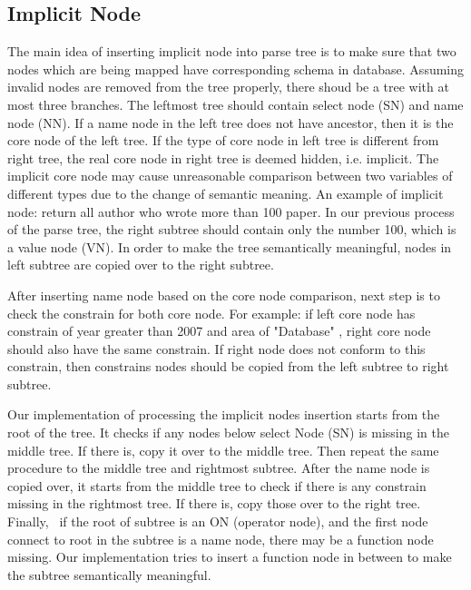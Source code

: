 \documentclass[twocolumn]{article}
\begin{document}
\subsection{Implicit Node}
The main idea of inserting implicit node into parse tree is to make sure that two nodes which are being mapped have corresponding schema in database. Assuming invalid nodes are removed from the tree properly, there shoud be a tree with at most three branches. The leftmost tree should contain select node (SN) and name node (NN). If a name node in the left tree does not have ancestor, then it is the core node of the left tree. If the type of core node in left tree is different from right tree, the real core node in right tree is deemed hidden, i.e. implicit. The implicit core node may cause unreasonable comparison between two variables of different types due to the change of semantic meaning. An example of implicit node: return all author who wrote more than 100 paper. In our previous process of the parse tree, the right subtree should contain only the number 100, which is a value node (VN). In order to make the tree semantically meaningful, nodes in left subtree are copied over to the right subtree.

After inserting name node based on the core node comparison, next step is to check the constrain for both core node. For example: if left core node has constrain of year greater than 2007 and area of "Database" , right core node should also have the same constrain. If right node does not conform to this constrain, then constrains nodes should be copied from the left subtree to right subtree. 

Our implementation of processing the implicit nodes insertion starts from the root of the tree. It checks if any nodes below select Node (SN) is missing in the middle tree. If there is, copy it over to the middle tree. Then repeat the same procedure to the middle tree and rightmost subtree. After the name node is copied over, it starts from the middle tree to check if there is any constrain missing in the rightmost tree. If there is, copy those over to the right tree. Finally,  if the root of subtree is an ON (operator node), and the first node connect to root in the subtree is a name node, there may be a function node missing. Our implementation tries to insert a function node in between to make the subtree semantically meaningful. 
\end{document}
